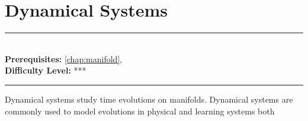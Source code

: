 \documentclass[book.tex]{subfiles}
\begin{document}
\chapter{Dynamical Systems}
\label{chap:dynamical_systems}
\noindent\rule{11cm}{0.4pt} \\
\textbf{Prerequisites:} \autoref{chap:manifold},  \\
\textbf{Difficulty Level:} *** \\
\noindent\rule{11cm}{0.4pt}
\vspace{5mm}

Dynamical systems study time evolutions on manifolds. Dynamical systems are commonly used to model evolutions in physical and learning systems both
\end{document}
